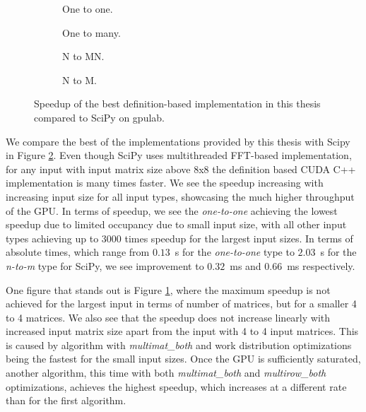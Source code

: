 \begin{figure}[ht]
	\centering	
	\begin{subfigure}{0.4\textwidth}
		\centering
		\def\svgwidth{\textwidth}
		
		\caption{One to one.}
	\end{subfigure}
	\begin{subfigure}{0.4\textwidth}
		\centering
		\def\svgwidth{\textwidth}
		
		\caption{One to many.}
	\end{subfigure}
	\begin{subfigure}{0.4\textwidth}
		\centering
		\def\svgwidth{\textwidth}
		
		\caption{N to MN.}
	\end{subfigure}
	\begin{subfigure}{0.4\textwidth}
		\centering
		\def\svgwidth{\textwidth}
		
		\caption{N to M.}
		\label{fig:scipy_n_to_m_gpulab}
	\end{subfigure}
	\caption{Speedup of the best definition-based implementation in this thesis compared to SciPy on gpulab.}
	\label{fig:scipy_speedup_gpulab}
\end{figure}


We compare the best of the implementations provided by this thesis with Scipy in Figure \ref{fig:scipy_speedup_gpulab}. Even though SciPy uses multithreaded FFT-based implementation, for any input with input matrix size above 8x8 the definition based CUDA C++ implementation is many times faster. We see the speedup increasing with increasing input size for all input types, showcasing the much higher throughput of the GPU. In terms of speedup, we see the \textit{one-to-one} achieving the lowest speedup due to limited occupancy due to small input size, with all other input types achieving up to $3000$ times speedup for the largest input sizes. In terms of absolute times, which range from $0.13$~s for the \textit{one-to-one} type to $2.03$~s for the \textit{n-to-m} type for SciPy, we see improvement to $0.32$~ms and $0.66$~ms respectively.

One figure that stands out is Figure \ref{fig:scipy_n_to_m_gpulab}, where the maximum speedup is not achieved for the largest input in terms of number of matrices, but for a smaller 4 to 4 matrices. We also see that the speedup does not increase linearly with increased input matrix size apart from the input with 4 to 4 input matrices. This is caused by algorithm with \textit{multimat\_both} and work distribution optimizations being the fastest for the small input sizes. Once the GPU is sufficiently saturated, another algorithm, this time with both \textit{multimat\_both} and \textit{multirow\_both} optimizations, achieves the highest speedup, which increases at a different rate than for the first algorithm.

